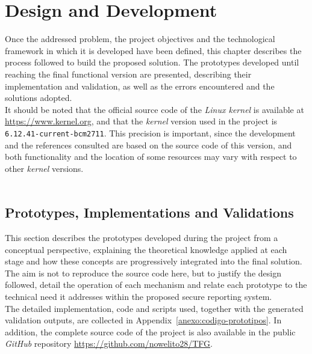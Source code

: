\chapter{Design and Development}
\label{cap:capitulo5}

Once the addressed problem, the project objectives and the technological framework in which it is developed have been defined, this chapter describes the process followed to build the proposed solution.
The prototypes developed until reaching the final functional version are presented, describing their implementation and validation, as well as the errors encountered and the solutions adopted.\\

It should be noted that the official source code of the \textit{Linux kernel} is available at \url{https://www.kernel.org}, and that the \textit{kernel} version used in the project is \texttt{6.12.41-current-bcm2711}.
This precision is important, since the development and the references consulted are based on the source code of this version, and both functionality and the location of some resources may vary with respect to other \textit{kernel} versions.\\

\

\section{Prototypes, Implementations and Validations}
\label{sec:prototipos-implementaciones-validaciones}

This section describes the prototypes developed during the project from a conceptual perspective, explaining the theoretical knowledge applied at each stage and how these concepts are progressively integrated into the final solution.
The aim is not to reproduce the source code here, but to justify the design followed, detail the operation of each mechanism and relate each prototype to the technical need it addresses within the proposed secure reporting system.\\

The detailed implementation, code and scripts used, together with the generated validation outputs, are collected in Appendix~\ref{anexo:codigo-prototipos}.
In addition, the complete source code of the project is also available in the public \textit{GitHub} repository \url{https://github.com/nowelito28/TFG}.\\

\


